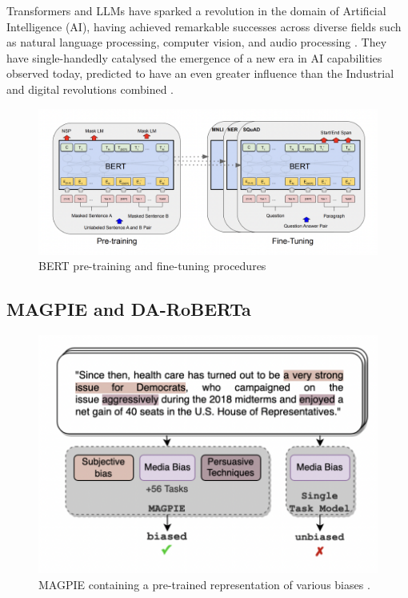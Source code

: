 Transformers and LLMs have sparked a revolution in the domain of Artificial Intelligence (AI), having achieved remarkable successes across diverse fields such as natural language processing, computer vision, and audio processing \cite{lin-2022-survey-transformers}. They have single-handedly catalysed the emergence of a new era in AI capabilities observed today, predicted to have an even greater influence than the Industrial and digital revolutions combined \cite{makridakis-2017-ai-revolution}.

\begin{figure}[htbp]
    \centering
    \includegraphics[width=0.9\linewidth]{images/bert_finetuning.png}
    \caption{BERT pre-training and fine-tuning procedures \cite{devlin-2019-bert}}
    \label{fig:bert_finetuning}
\end{figure}


\subsection{MAGPIE and DA-RoBERTa}

\begin{figure}[htbp]
    \centering
    \includegraphics[width=0.7\linewidth]{images/magpie.png}
    \caption{MAGPIE containing a pre-trained representation of various biases \cite{horych-2024-magpie}.}
    \label{fig:magpie}
\end{figure}

